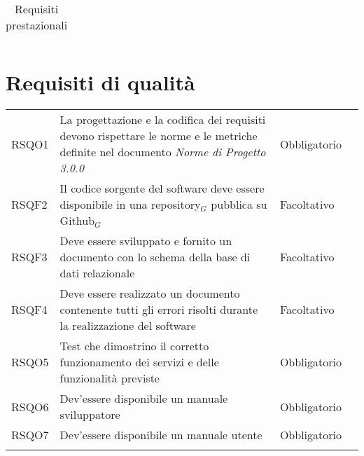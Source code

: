 {{\begin{center}
\begin{longtable}{|p{4cm}|p{4cm}|p{4cm}|p{3cm}|}
		\caption[Requisiti prestazionali]{Requisiti prestazionali}\label{4.2}\\
			\end{longtable}
	\end{center}
\newpage
\section{Requisiti di qualità}\label{RequisitiDiQualita}
\def\tabularxcolumn#1{m{#1}}
{

	\begin{center}
		\renewcommand{\arraystretch}{1.4}
		\begin{longtable}{|p{4cm}|p{4cm}|p{4cm}|p{3cm}|}
			\hline
			\rowcolor{airforceblue}
			\makecell[c]{\textbf{Codice RS}} & \makecell[c]{\textbf{Descrizione}} & \makecell[c]{\textbf{Tipo di requisito}} & \makecell[c]{\textbf{Fonte}} \\
			\hline
		\centering RSQO1  & La progettazione e la codifica dei requisiti devono rispettare le norme e le metriche definite nel documento \textit{Norme di Progetto 3.0.0}&\centering  Obbligatorio & \makecell[tc]{Interno} \\
		\hline
		\centering RSQF2  & Il codice sorgente del software deve essere disponibile in una repository$_G$ pubblica su Github$_G$  &\centering  Facoltativo & \makecell[tc]{Interno} \\
		\hline
		\centering RSQF3  & Deve essere sviluppato e fornito un documento con lo schema della base di dati relazionale  & \centering Facoltativo & \makecell[tc]{Interno } \\
		\hline
		\centering RSQF4  & Deve essere realizzato un documento contenente tutti gli errori risolti durante la realizzazione del software &\centering  Facoltativo & \makecell[tc]{Interno} \\
		\hline
		\centering RSQO5  & Test che dimostrino il corretto funzionamento dei servizi e delle funzionalità previste  & \centering Obbligatorio & \makecell[tc]{Capitolato$_{\scaleto{G}{3pt}}$} \\
		\hline
		\centering RSQO6  & Dev'essere disponibile un manuale sviluppatore  & \centering Obbligatorio & \makecell[tc]{Capitolato$_{\scaleto{G}{3pt}}$} \\
		\hline
		\centering RSQO7  & Dev'essere disponibile un manuale utente  & \centering Obbligatorio & \makecell[tc]{Capitolato$_{\scaleto{G}{3pt}}$} \\
		\hline
		\rowcolor{white}


\end{longtable}
\end{center}}}}

